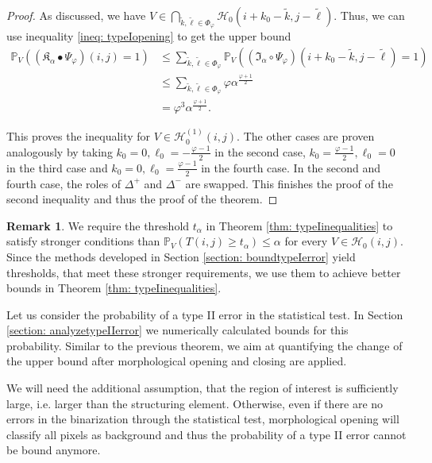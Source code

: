 \documentclass[a4paper,12pt]{article}
\theoremstyle{plain}
\theoremstyle{definition}
\newtheorem{remark}[theorem]{Remark}
\begin{document}
\begin{proof}
	As discussed, we have $V \in \bigcap_{\tilde{k}, \tilde{\ell} \in \Phi_\varphi} \mathcal{H}_0(i + k_0 - \tilde{k}, j - \tilde{\ell})$. Thus, we can use inequality \eqref{ineq: typeIopening} to get the upper bound
	\begin{align*}
		\mathbb{P}_V\left( (\mathfrak{K}_\alpha \bullet \Psi_\varphi)(i, j) = 1 \right) &\leq \sum_{\tilde{k}, \tilde{\ell} \in \Phi_\varphi} \mathbb{P}_V\left( (\mathfrak{I}_\alpha \circ \Psi_\varphi)(i + k_0 - \tilde{k}, j - \tilde{\ell}) = 1 \right) \\
		&\leq \sum_{\tilde{k}, \tilde{\ell} \in \Phi_\varphi} \varphi \alpha^{\frac{\varphi + 1}{2}} \\
		&= \varphi^3 \alpha^{\frac{\varphi + 1}{2}}.
	\end{align*}
	
	This proves the inequality for $V \in \mathcal{H}_0^{(1)}(i, j)$. The other cases are proven analogously by taking $k_0 = 0, \ell_0 = -\frac{\varphi - 1}{2}$ in the second case, $k_0 = \frac{\varphi - 1}{2}, \ell_0 = 0$ in the third case and $k_0 = 0, \ell_0 = \frac{\varphi - 1}{2}$ in the fourth case. In the second and fourth case, the roles of $\Delta^+$ and $\Delta^-$ are swapped. This finishes the proof of the second inequality and thus the proof of the theorem.
\end{proof}

\begin{remark}
	We require the threshold $t_\alpha$ in Theorem \ref{thm: typeIinequalities} to satisfy stronger conditions than $\mathbb{P}_V( T(i, j) \geq t_\alpha ) \leq \alpha$ for every $V \in \mathcal{H}_0(i, j)$. Since the methods developed in Section \ref{section: boundtypeIerror} yield thresholds, that meet these stronger requirements, we use them to achieve better bounds in Theorem \ref{thm: typeIinequalities}.
\end{remark}

Let us consider the probability of a type II error in the statistical test. In Section \ref{section: analyzetypeIIerror} we numerically calculated bounds for this probability. Similar to the previous theorem, we aim at quantifying the change of the upper bound after morphological opening and closing are applied.

We will need the additional assumption, that the region of interest is sufficiently large, i.e. larger than the structuring element. Otherwise, even if there are no errors in the binarization through the statistical test, morphological opening will classify all pixels as background and thus the probability of a type II error cannot be bound anymore.
\end{document}

